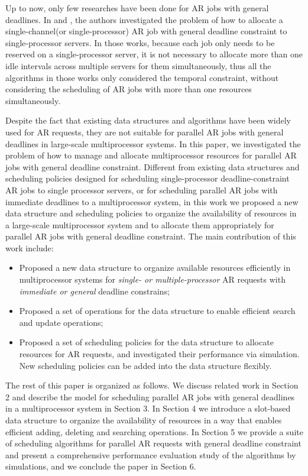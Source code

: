 \documentclass[preprint,12pt]{elsarticle}
\begin{document}
Up to now, only few researches have been done for AR jobs with general deadlines. In \cite{xu2004efficient} and \cite{castillo2011online,castillo2007design}, the authors investigated the problem of how to allocate a single-channel(or single-processor) AR job with general deadline constraint to  single-processor servers. In those works, because each job only needs to be reserved on a single-processor server, it is not necessary to allocate more than one idle intervals across multiple servers for them simultaneously, thus all the algorithms in those works only considered the temporal constraint, without considering the scheduling of AR jobs with more than one resources simultaneously.



Despite the fact that existing data structures and algorithms have been widely used for AR requests, they are not suitable for parallel AR jobs with general deadlines in large-scale multiprocessor systems. In this paper, we investigated the problem of how to manage and allocate multiprocessor resources for parallel AR jobs with general deadline constraint. Different from existing data structures and scheduling policies designed for scheduling single-processor deadline-constraint AR jobs to  single processor servers, or for scheduling parallel AR jobs with immediate deadlines to a multiprocessor system, in this work we proposed a new data structure and scheduling policies to organize the availability of resources in a large-scale multiprocessor system and to allocate them appropriately for parallel AR jobs with general deadline constraint. The main contribution of this work include:
\begin{itemize}
  \item {Proposed a new data structure to organize available resources efficiently in multiprocessor systems for \emph{single- or multiple-processor} AR requests with \emph{immediate or general }deadline constrains;}
  \item{Proposed a set of operations for the data structure to enable efficient search and update operations;}
\item{Proposed a set of scheduling policies for the data structure to allocate resources for AR requests, and investigated their performance via simulation. New scheduling policies can be added into the data structure flexibly.}
\end{itemize}


The rest of this paper is organized as follows. We discuss related work in Section 2 and describe the model for scheduling parallel AR jobs with general deadlines in a multiprocessor system in Section 3. In Section 4 we introduce a slot-based data structure to organize the availability of resources in a way that enables efficient adding, deleting and searching operations. In Section 5 we provide a suite of scheduling algorithms for parallel AR requests with general deadline constraint and present a comprehensive performance evaluation study of the algorithms by simulations, and we conclude the paper in Section 6.
\end{document}
